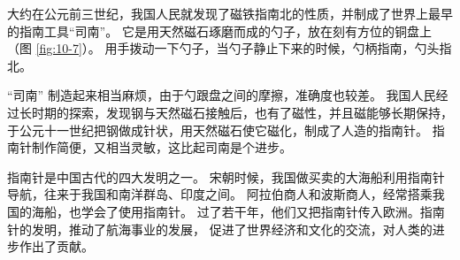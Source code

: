 大约在公元前三世纪，我国人民就发现了磁铁指南北的性质，并制成了世界上最早的指南工具“司南”。
它是用天然磁石琢磨而成的勺子，放在刻有方位的铜盘上（图 \ref{fig:10-7}）。
用手拨动一下勺子，当勺子静止下来的时候，勺柄指南，勺头指北。

“司南” 制造起来相当麻烦，由于勺跟盘之间的摩擦，准确度也较差。
我国人民经过长时期的探索，发现钢与天然磁石接触后，也有了磁性，并且磁能够长期保持，
于公元十一世纪把钢做成针状，用天然磁石使它磁化，制成了人造的指南针。
指南针制作简便，又相当灵敏，这比起司南是个进步。

指南针是中国古代的四大发明之一。
宋朝时候，我国做买卖的大海船利用指南针导航，往来于我国和南洋群岛、印度之间。
阿拉伯商人和波斯商人，经常搭乘我国的海船，也学会了使用指南针。
过了若干年，他们又把指南针传入欧洲。指南针的发明，推动了航海事业的发展，
促进了世界经济和文化的交流，对人类的进步作出了贡献。

